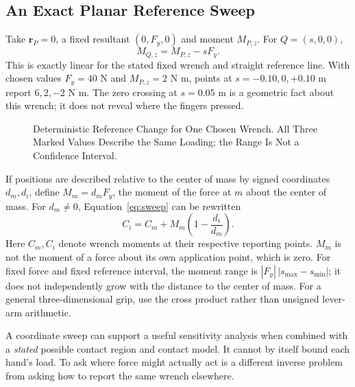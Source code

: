 \documentclass[11pt,a4paper]{article}
\newcommand{\vect}[1]{\boldsymbol{#1}}
\begin{document}
\subsection{An Exact Planar Reference Sweep}
Take $\vect r_P=0$, a fixed resultant $(0,F_y,0)$ and moment $M_{P,z}$. For $Q=(s,0,0)$,
\begin{equation}
M_{Q,z}=M_{P,z}-sF_y.\label{eq:sweep}
\end{equation}
This is exactly linear for the stated fixed wrench and straight reference line. With chosen values $F_y=40$ N and $M_{P,z}=2$ N m, points at $s=-0.10,0,+0.10$ m report $6,2,-2$ N m. The zero crossing at $s=0.05$ m is a geometric fact about this wrench; it does not reveal where the fingers pressed.

\begin{figure}[htbp]\centering
{}
\caption{Deterministic Reference Change for One Chosen Wrench. All Three Marked Values Describe the Same Loading; the Range Is Not a Confidence Interval.}
\label{fig:couple_range}\end{figure}

If positions are described relative to the center of mass by signed coordinates $d_m,d_i$, define $M_m=d_mF_y$, the moment of the force at $m$ about the center of mass. For $d_m\ne0$, Equation~\ref{eq:sweep} can be rewritten
\begin{equation}
C_i=C_m+M_m\left(1-\frac{d_i}{d_m}\right).
\end{equation}
Here $C_m,C_i$ denote wrench moments at their respective reporting points. $M_m$ is not the moment of a force about its own application point, which is zero. For fixed force and fixed reference interval, the moment range is $|F_y|\,|s_{\max}-s_{\min}|$; it does not independently grow with the distance to the center of mass. For a general three-dimensional grip, use the cross product rather than unsigned lever-arm arithmetic.

A coordinate sweep can support a useful sensitivity analysis when combined with a \emph{stated} possible contact region and contact model. It cannot by itself bound each hand's load. To ask where force might actually act is a different inverse problem from asking how to report the same wrench elsewhere.
\end{document}

